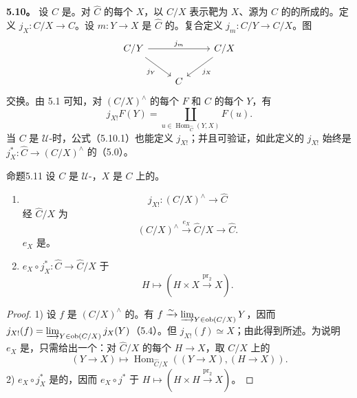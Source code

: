 \textbf{5.10。} 设 $C$ 是。对 $\widehat C$ 的每个 $X$，以 $C/X$ 表示靶为 $X$、源为 $C$ 的的所成的。定义 $j_X:C/X\to C$。设 $m:Y\to X$ 是 $\widehat C$ 的。复合定义 $j_m:C/Y\to C/X$。图
\[\begin{tikzcd}C/Y\arrow[rr,"j_m"]\arrow[dr,"j_Y"']&&C/X\arrow[dl,"j_X"]\\&C&\end{tikzcd}\]
交换。由 5.1 可知，对 $(C/X)^{\wedge}$ 的每个 $F$ 和 $C$ 的每个 $Y$，有
\[j_{X!}F(Y)=\coprod_{u\in\operatorname{Hom}_{\widehat C}(Y,X)}F(u).\tag{5.10.1}\]
当 $C$ 是 $\mathcal U$-时，公式（5.10.1）也能定义 $j_{X!}$；并且可验证，如此定义的 $j_{X!}$ 始终是 $j_X^*:\widehat C\to(C/X)^{\wedge}$ 的（5.0）。
\begin{SGAresult}{命题}{5.11}
设 $C$ 是 $\mathcal U$-，$X$ 是 $C$ 上的。
\begin{enumerate}
\item {}
\[j_{X!}:(C/X)^{\wedge}\longrightarrow\widehat C\]
经 $\widehat C/X$ 为
\[(C/X)^{\wedge}\xrightarrow{e_X}\widehat C/X\longrightarrow\widehat C.\]
 $e_X$ 是。
\item {} $e_X\circ j_X^*:\widehat C\to\widehat C/X$ 于
\[H\longmapsto(H\times X\xrightarrow{\operatorname{pr}_2}X).\]
\end{enumerate}
\end{SGAresult}
\begin{proof}
1) 设 $f$ 是 $(C/X)^{\wedge}$ 的。有 $f\xrightarrow{\sim}\varinjlim_{Y\in\operatorname{ob}(C/X)}Y$，因而 $j_{X!}(f)=\varinjlim_{Y\in\operatorname{ob}(C/X)}j_X(Y)$（5.4）。但 $j_{X!}(f)\simeq X$；由此得到所述。为说明 $e_X$ 是，只需给出一个：对 $\widehat C/X$ 的每个 $H\to X$，取 $C/X$ 上的
\[(Y\to X)\longmapsto\operatorname{Hom}_{\widehat C/X}((Y\to X),(H\to X)).\]
2)  $e_X\circ j_X^*$ 是的，因而 $e_X\circ j^*$ 于 $H\mapsto(H\times H\xrightarrow{\operatorname{pr}_2}X)$。
\end{proof}
